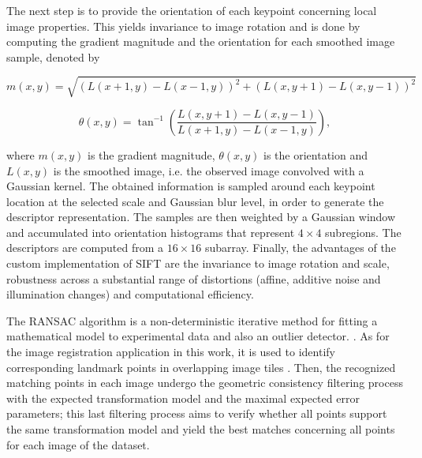 The next step is to provide the orientation of each keypoint concerning local image properties. This yields invariance to image rotation and is done by computing the gradient magnitude and the orientation for each smoothed image sample, denoted by

\begin{equation}
m(x,y) = \sqrt{(L(x + 1, y) - L(x - 1, y))^{2} + (L(x, y + 1) - L(x, y - 1))^{2}}
\end{equation}

\begin{equation}
\theta(x,y) = \tan^{-1}
			\left(
			\frac{L(x, y + 1) - L(x, y - 1)}
				 {L(x + 1, y) - L(x - 1, y)}
			\right),
\end{equation}

\noindent where $m(x,y)$ is the gradient magnitude, $\theta(x,y)$ is the orientation and $L(x,y)$ is the smoothed image, i.e. the observed image convolved with a Gaussian kernel. The obtained information is sampled around each keypoint location at the selected scale and Gaussian blur level, in order to generate the descriptor representation. The samples are then weighted by a Gaussian window and accumulated into orientation histograms that represent $4 \times 4$ subregions. The descriptors are computed from a $16 \times 16$ subarray. Finally, the advantages of the custom implementation of SIFT are the invariance to image rotation and scale, robustness across a substantial range of distortions (affine, additive noise and illumination changes) and computational efficiency.

The RANSAC algorithm is a non-deterministic iterative method for fitting a mathematical model to experimental data and also an outlier detector. \cite{fischler1981random}. As for the image registration application in this work, it is used to identify corresponding landmark points in overlapping image tiles \cite{saalfeld2019computational}. Then, the recognized matching points in each image undergo the geometric consistency filtering process with the expected transformation model and the maximal expected error parameters; this last filtering process aims to verify whether all points support the same transformation model and yield the best matches concerning all points for each image of the dataset.